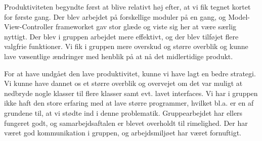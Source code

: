 Produktiviteten begyndte først at blive relativt høj efter, at vi fik tegnet kortet for første gang. Der blev arbejdet på forskellige moduler på en gang, og Model-View-Controller frameworket gav stor glæde og viste sig her at være særlig nyttigt. Der blev i gruppen arbejdet mere effektivt, og der blev tilføjet flere valgfrie funktioner. Vi fik i gruppen mere overskud og større overblik og kunne lave væsentlige ændringer med henblik på at nå det midlertidige produkt. 

For at have undgået den lave produktivitet, kunne vi have lagt en bedre strategi. Vi kunne have dannet os et større overblik og overvejet om det var muligt at nedbryde nogle klasser til flere klasser samt evt. lavet interfaces. Vi har i gruppen ikke haft den store erfaring med at lave større programmer, hvilket bl.a. er en af grundene til, at vi stødte ind i denne problematik. Gruppearbejdet har ellers fungeret godt, og samarbejdsaftalen er blevet overholdt til rimelighed. Der har været god kommunikation i gruppen, og arbejdsmiljøet har været fornuftigt. 